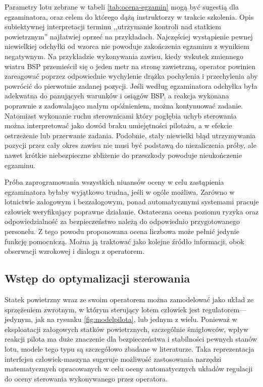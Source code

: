 Parametry lotu zebrane w tabeli \ref{tab:ocena-egzamin} mogą być sugestią dla egzaminatora, oraz celem do którego dążą instruktorzy w trakcie szkolenia. Opis subiektywnej interpretacji terminu ,,utrzymanie kontroli nad statkiem powietrznym'' najłatwiej oprzeć na przykładach. Najczęściej wystąpienie pewnej niewielkiej odchyłki od wzorca nie powoduje zakończenia egzaminu z wynikiem negatywnym. Na przykładzie wykonywania zawisu, kiedy wskutek zmiennego wiatru BSP przemieścił się o jeden metr na stronę zawietrzną, operator powinien zareagować poprzez odpowiednie wychylenie drążka pochylenia i przechylenia aby powrócić do pierwotnie zadanej pozycji. Jeśli według egzaminatora odchyłka była adekwatna do panujących warunków i osiągów BSP, a reakcja wykonana poprawnie z zadowalająco małym opóźnieniem, można kontynuować zadanie. Natomiast wykonanie ruchu sterownicami który pogłębia uchyb sterowania można interpretować jako dowód braku umiejętności pilotażu, a w efekcie ostrzeżenie lub przerwanie zadania. Podobnie, stały niewielki błąd utrzymywania pozycji przez cały okres zawisu nie musi być podstawą do niezaliczenia próby, ale nawet krótkie niebezpieczne zbliżenie do przeszkody powoduje nieukończenie egzaminu.

Próba zaprogramowania wszystkich niuansów oceny w celu zastąpienia egzaminatora byłaby wyjątkowo trudna, jeśli w ogóle możliwa. Zarówno w lotnictwie załogowym i bezzałogowym, ponad automatycznymi systemami pracuje człowiek weryfikujący poprawne działanie. Ostateczna ocena poziomu ryzyka oraz odpowiedzialność za bezpieczeństwo należą do odpowiednio przygotowanego personelu. Z tego powodu proponowana ocena liczbowa może pełnić jedynie funkcję pomocniczą. Można ją traktować jako kolejne źródło informacji, obok obserwacji wzrokowej i dialogu z operatorem.

\subsection{Wstęp do optymalizacji sterowania}
\label{sec:ocena-teoria}
Statek powietrzny wraz ze swoim operatorem można zamodelować jako układ ze sprzężeniem zwrotnym, w którym sterujący lotem człowiek jest regulatorem---jedynym, jak na rysunku \ref{fig:modelpilota}, lub jednym z wielu. Ponieważ w eksploatacji załogowych statków powietrznych, szczególnie śmigłowców, wpływ reakcji pilota ma duże znaczenie dla bezpieczeństwa i stabilności pewnych stanów lotu, modele tego typu są szczegółowo zbadane w literaturze\cite{roskam1998}. Taka reprezentacja interfejsu człowiek-maszyna sugeruje możliwość zastosowania narzędzi matematycznych opracowanych w celu oceny automatycznych układów regulacji do oceny sterowania wykonywanego przez operatora.

